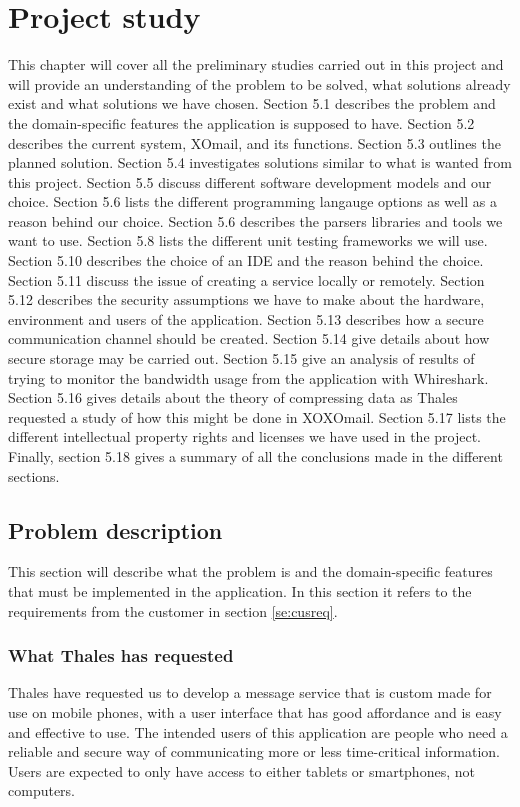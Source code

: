 \chapter{Project study}

This chapter will cover all the preliminary studies carried out in this project and will provide an understanding of the problem to be solved, what solutions already exist and what solutions we have chosen. Section 5.1 describes the problem and the domain-specific features the application is supposed to have. Section 5.2 describes the current system, XOmail, and its functions. Section 5.3 outlines the planned solution. Section 5.4 investigates solutions similar to what is wanted from this project. Section 5.5 discuss different software development models and our choice. Section 5.6 lists the different programming langauge options as well as a reason behind our choice. Section 5.6 describes the parsers libraries and tools we want to use. Section 5.8 lists the different unit testing frameworks we will use. Section 5.10 describes the choice of an IDE and the reason behind the choice. Section 5.11 discuss the issue of creating a service locally or remotely. Section 5.12 describes the security assumptions we have to make about the hardware, environment and users of the application. Section 5.13 describes how a secure communication channel should be created. Section 5.14 give details about how secure storage may be carried out. Section 5.15 give an analysis of results of trying to monitor the bandwidth usage from the application with Whireshark. Section 5.16 gives details about the theory of compressing data as Thales requested a study of how this might be done in XOXOmail. Section 5.17 lists the different intellectual property rights and licenses we have used in the project. Finally, section 5.18 gives a summary of all the conclusions made in the different sections.

\section{Problem description}

This section will describe what the problem is and the domain-specific features that must be implemented in the application. In this section it refers to the requirements from the customer in section \ref{se:cusreq}.

\subsection{What Thales has requested}
Thales have requested us to develop a message service that is custom made for use on mobile phones, with a user interface that has good affordance and is easy and effective to use.
\newline
\newline
The intended users of this application are people who need a reliable and secure way of communicating more or less time-critical information. Users are expected to only have access to either tablets or smartphones, not computers.

